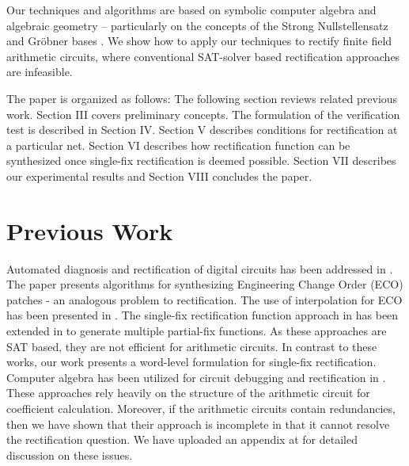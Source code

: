 Our techniques and algorithms are based on symbolic computer algebra
and algebraic geometry -- particularly on the concepts of the Strong
Nullstellensatz and Gr\"obner bases \cite{gb_book}. We show how to
apply our techniques to rectify finite field arithmetic circuits,
where conventional SAT-solver based rectification approaches are
infeasible.

The paper is organized as follows: The following section reviews
related previous work. Section III covers preliminary concepts. The
formulation of the verification test is described in Section
IV. Section V describes conditions for rectification at a particular
net. Section VI describes how rectification function can be
synthesized once single-fix rectification is deemed possible. Section
VII describes our experimental results and Section VIII concludes the
paper. 


\section{Previous Work}
Automated diagnosis and rectification of digital circuits
has been addressed in \cite{Madre:ICCAD89,Liaw:ICCAD90}. The paper \cite{Sadowska:DAC95} presents 
algorithms for synthesizing Engineering 
Change Order (ECO) patches - an analogous problem to rectification. 
The use of interpolation for ECO has been presented in \cite{Huang:DAC2011,roland:iccad10}.
The single-fix rectification function approach in \cite{roland:iccad10} 
has been extended in \cite{Huang:DAC2011} to generate multiple partial-fix functions.
As these approaches are SAT based, they are not efficient for arithmetic circuits. In contrast to 
these works, our work presents a word-level formulation for single-fix rectification.
Computer algebra has been utilized for circuit debugging and rectification in
\cite{farimah:2017:1,farimah:2016:1}. These approaches rely heavily on
the structure of the arithmetic circuit for coefficient calculation. Moreover,
if the arithmetic circuits contain redundancies, then we have shown
that their approach is incomplete in that it cannot resolve the
rectification question. We have uploaded an appendix at \cite{farimah_cex} for detailed discussion on these
issues.



